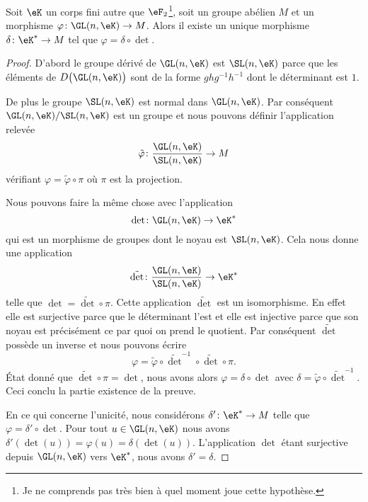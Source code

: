 \begin{lemma}   \label{LemcDOTzM}
    Soit \( \eK\) un corps fini autre que \( \eF_2\)\footnote{Je ne comprends pas très bien à quel moment joue cette hypothèse.}, soit un groupe abélien \( M\) et un morphisme \( \varphi\colon \GL(n,\eK)\to M\). Alors il existe un unique morphisme \( \delta\colon \eK^*\to M\) tel que \( \varphi=\delta\circ\det\).
\end{lemma}

\begin{proof}
    D'abord le groupe dérivé de \( \GL(n,\eK)\) est \( \SL(n,\eK)\) parce que les éléments de \( D\big( \GL(n,\eK) \big)\) sont de la forme \( ghg^{-1}h^{-1}\) dont le déterminant est \( 1\).
    
    De plus le groupe \( \SL(n,\eK)\) est normal dans \( \GL(n,\eK)\). Par conséquent \( \GL(n,\eK)/\SL(n,\eK)\) est un groupe et nous pouvons définir l'application relevée
    \begin{equation}
        \tilde \varphi\colon \frac{ \GL(n,\eK) }{ \SL(n,\eK) }\to M
    \end{equation}
    vérifiant \( \varphi=\tilde \varphi\circ\pi\) où \( \pi\) est la projection. 

    Nous pouvons faire la même chose avec l'application
    \begin{equation}
        \det\colon \GL(n,\eK)\to \eK^*
    \end{equation}
    qui est un morphisme de groupes dont le noyau est \( \SL(n,\eK)\). Cela nous donne une application
    \begin{equation}
        \tilde \det\colon \frac{ \GL(n,\eK) }{ \SL(n,\eK) }\to \eK^*
    \end{equation}
    telle que \( \det=\tilde \det\circ\pi\). Cette application \( \tilde \det\) est un isomorphisme. En effet elle est surjective parce que le déterminant l'est et elle est injective parce que son noyau est précisément ce par quoi on prend le quotient. Par conséquent \( \tilde \det \) possède un inverse et nous pouvons écrire
    \begin{equation}
        \varphi=\tilde \varphi\circ\tilde \det^{-1}\circ\tilde \det\circ\pi.
    \end{equation}
    État donné que \( \tilde \det\circ\pi=\det\), nous avons alors \( \varphi=\delta\circ\det\) avec \( \delta=\tilde \varphi\circ\tilde \det^{-1}\). Ceci conclu la partie existence de la preuve.

    En ce qui concerne l'unicité, nous considérons \( \delta'\colon \eK^*\to M\) telle que \( \varphi=\delta'\circ\det\). Pour tout \( u\in \GL(n,\eK)\) nous avons \( \delta'(\det(u))=\varphi(u)=\delta(\det(u))\). L'application \( \det\) étant surjective depuis \( \GL(n,\eK)\) vers \( \eK^*\), nous avons \( \delta'=\delta\).
\end{proof}

